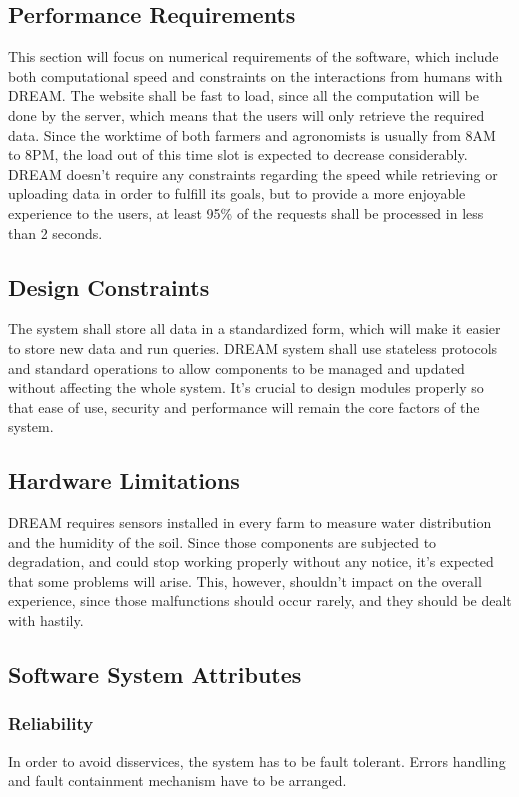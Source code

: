 \subsection{Performance Requirements}
This section will focus on numerical requirements of the software, which include both computational speed and constraints on the interactions from humans with DREAM.
The website shall be fast to load, since all the computation will be done by the server, which means that the users will only retrieve the required data.
Since the worktime of both farmers and agronomists is usually from 8AM to 8PM, the load out of this time slot is expected to decrease considerably.
DREAM doesn’t require any constraints regarding the speed while retrieving or uploading data in order to fulfill its goals, but to provide a more enjoyable experience to the users, at least 95\% of the requests shall be processed in less than 2 seconds.
\subsection{Design Constraints}
The system shall store all data in a standardized form, which will make it easier to store new data and run queries.
DREAM system shall use stateless protocols and standard operations to allow components to be managed and updated without affecting the whole system. It’s crucial to design modules properly so that ease of use, security and performance will remain the core factors of the system.
\subsection{Hardware Limitations}
DREAM requires sensors installed in every farm to measure water distribution and the humidity of the soil. Since those components are subjected to degradation, and could stop working properly without any notice, it’s expected that some problems will arise.
This, however, shouldn't impact on the overall experience, since those malfunctions should occur rarely, and they should be dealt with hastily.
\subsection{Software System Attributes}
\subsubsection{Reliability}
In order to avoid disservices, the system has to be fault tolerant. Errors handling and fault containment mechanism have to be arranged.
